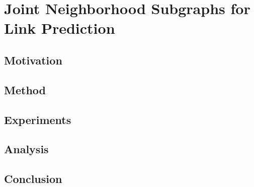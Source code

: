 \chapter{Joint Neighborhood Subgraphs for Link Prediction}
\section{Motivation}
\section{Method}
\section{Experiments}
\section{Analysis}
\section{Conclusion}